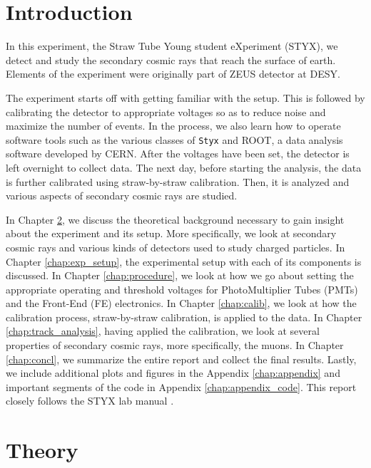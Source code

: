 \documentclass[a4paper]{report}
\numberwithin{equation}{section}
\begin{document}
\tableofcontents

\chapter{Introduction} \label{chap:intro}

In this experiment, the Straw Tube Young student eXperiment (STYX), we detect and study the secondary cosmic rays that reach the surface of earth. Elements of the experiment were originally part of ZEUS detector at DESY. 

The experiment starts off with getting familiar with the setup. This is followed by calibrating the detector to appropriate voltages so as to reduce noise and maximize the number of events. In the process, we also learn how to operate software tools such as the various classes of \texttt{Styx} and ROOT, a data analysis software developed by CERN. After the voltages have been set, the detector is left overnight to collect data. The next day, before starting the analysis, the data is further calibrated using straw-by-straw calibration. Then, it is analyzed and various aspects of secondary cosmic rays are studied. 

In Chapter \ref{chap:theory}, we discuss the theoretical background necessary to gain insight about the experiment and its setup. More specifically, we look at secondary cosmic rays and various kinds of detectors used to study charged particles. In Chapter \ref{chap:exp_setup}, the experimental setup with each of its components is discussed. In Chapter \ref{chap:procedure}, we look at how we go about setting the appropriate operating and threshold voltages for PhotoMultiplier Tubes (PMTs) and the Front-End (FE) electronics. In Chapter \ref{chap:calib}, we look at how the calibration process, straw-by-straw calibration, is applied to the data. In Chapter \ref{chap:track_analysis}, having applied the calibration, we look at several properties of secondary cosmic rays, more specifically, the muons. In Chapter \ref{chap:concl}, we summarize the entire report and collect the final results. Lastly, we include additional plots and figures in the Appendix \ref{chap:appendix} and important segments of the code in Appendix \ref{chap:appendix_code}. This report closely follows the STYX lab manual \cite{labman}.

\chapter{Theory} \label{chap:theory}
\end{document}
